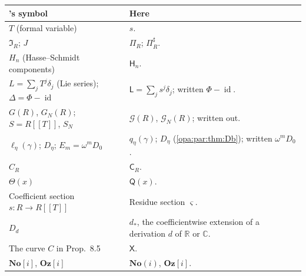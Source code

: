 \documentclass[11pt,oneside]{article}
\numberwithin{equation}{section}
\theoremstyle{definition}
\theoremstyle{remark}
\newcommand{\No}{\mathbf{No}}
\newcommand{\Oz}{\mathbf{Oz}}
\newcommand{\Og}{\mathbf{Oz}[i]}
\newcommand{\SC}{\mathbf{No}(i)}
\newcommand{\R}{\mathbb R}
\newcommand{\C}{\mathbb C}
\newcommand{\id}{\operatorname{id}}
\begin{document}
\begin{center}
\renewcommand{\arraystretch}{1.15}
\begin{longtable}{>{\raggedright\arraybackslash}p{}>{\raggedright\arraybackslash}p{}}
\toprule
19's symbol & Here\\
\midrule
\endhead
$T$ (formal variable) & $s$.\\
$\mathfrak I_R$; $J$ & $\Pi_R$; $\Pi^\sharp_R$.\\
$H_n$ (Hasse--Schmidt components) & $\mathsf H_n$.\\
$L=\sum_jT^j\delta_j$ (Lie series); $\Delta=\Phi-\id$ & $\mathsf L=\sum_js^j\delta_j$; written $\Phi-\id$.\\
$G(R)$, $G_N(R)$; $S=R[[T]]$, $S_N$ & $\mathcal G(R)$, $\mathcal G_N(R)$; written out.\\
$\ell_\eta(\gamma)$; $D_\eta$; $E_m=\omega^mD_0$ & $q_\eta(\gamma)$; $D_\eta$ (\cref{opa:par:thm:Db}); written $\omega^mD_0$.\\
$C_R$ & $\mathsf C_R$.\\
$\Theta(x)$ & $\mathsf Q(x)$.\\
Coefficient section $s:R\to R[[T]]$ & Residue section $\varsigma$.\\
$D_d$ & $d_*$, the coefficientwise extension of a derivation $d$ of $\R$ or $\C$.\\
The curve $C$ in Prop.~8.5 & $\mathsf X$.\\
$\No[i]$, $\Oz[i]$ & $\SC$, $\Og$.\\
\bottomrule
\end{longtable}
\end{center}
\end{document}
